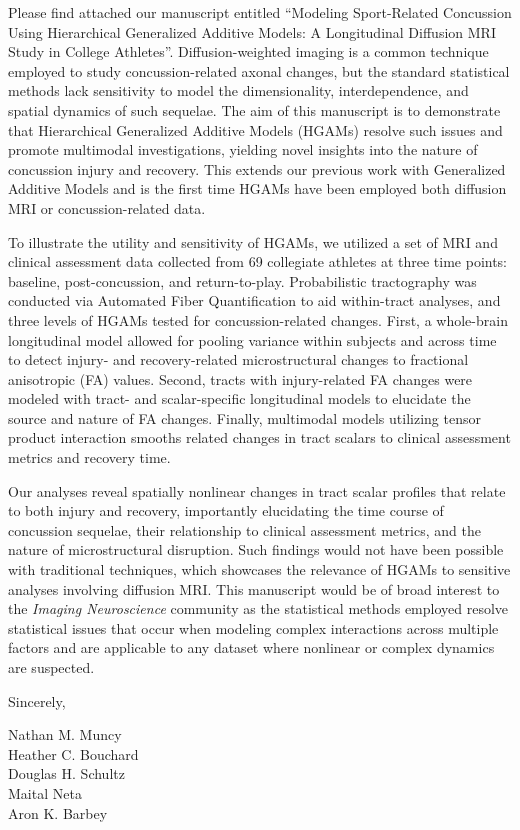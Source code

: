 \documentclass{article}
\begin{document}
Please find attached our manuscript entitled ``Modeling Sport-Related Concussion Using Hierarchical Generalized Additive Models: A Longitudinal Diffusion MRI Study in College Athletes''. Diffusion-weighted imaging is a common technique employed to study concussion-related axonal changes, but the standard statistical methods lack sensitivity to model the dimensionality, interdependence, and spatial dynamics of such sequelae. The aim of this manuscript is to demonstrate that Hierarchical Generalized Additive Models (HGAMs) resolve such issues and promote multimodal investigations, yielding novel insights into the nature of concussion injury and recovery. This extends our previous work with Generalized Additive Models and is the first time HGAMs have been employed both diffusion MRI or concussion-related data.

To illustrate the utility and sensitivity of HGAMs, we utilized a set of MRI and clinical assessment data collected from 69 collegiate athletes at three time points: baseline, post-concussion, and return-to-play. Probabilistic tractography was conducted via Automated Fiber Quantification to aid within-tract analyses, and three levels of HGAMs tested for concussion-related changes. First, a whole-brain longitudinal model allowed for pooling variance within subjects and across time to detect injury- and recovery-related microstructural changes to fractional anisotropic (FA) values. Second, tracts with injury-related FA changes were modeled with tract- and scalar-specific longitudinal models to elucidate the source and nature of FA changes. Finally, multimodal models utilizing tensor product interaction smooths related changes in tract scalars to clinical assessment metrics and recovery time.

Our analyses reveal spatially nonlinear changes in tract scalar profiles that relate to both injury and recovery, importantly elucidating the time course of concussion sequelae, their relationship to clinical assessment metrics, and the nature of microstructural disruption. Such findings would not have been possible with traditional techniques, which showcases the relevance of HGAMs to sensitive analyses involving diffusion MRI. This manuscript would be of broad interest to the \textit{Imaging Neuroscience} community as the statistical methods employed resolve statistical issues that occur when modeling complex interactions across multiple factors and are applicable to any dataset where nonlinear or complex dynamics are suspected.

\par\vspace{2ex}
Sincerely,

\bigskip\bigskip

Nathan M. Muncy\\
Heather C. Bouchard\\
Douglas H. Schultz\\
Maital Neta\\
Aron K. Barbey
\end{document}
